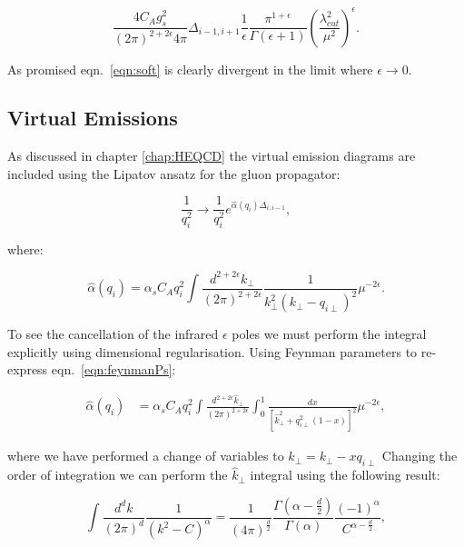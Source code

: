 			\begin{equation}
				\frac{4C_Ag_s^2}{(2\pi)^{2+2\epsilon}4\pi}\Delta_{i-1, i+1}
				\frac{1}{\epsilon}\frac{\pi^{1+\epsilon}}
				{\Gamma(\epsilon+1)}\left(\frac{\lambda_{cut}^2}{\mu^2}\right)^\epsilon.
				\label{eqn:soft}
			\end{equation}

			As promised eqn.~\eqref{eqn:soft} is clearly divergent in the limit where $\epsilon\to0$.

	\subsection{Virtual Emissions}
		\label{sub:subsection_name}

		As discussed in chapter \ref{chap:HEQCD} the virtual emission diagrams are included
		using the Lipatov ansatz for the gluon propagator:

		\begin{equation}
			\frac{1}{q_i^2}\longrightarrow\frac{1}{q_i^2}e^{\hat{\alpha}(q_i)\Delta_{i,i-1}},
		\end{equation}

		where:

		\begin{equation}
			\hat{\alpha}(q_i) = \alpha_sC_Aq_i^2\int \frac{d^{2+2\epsilon}k_{\perp}}{(2\pi)^{2+2\epsilon}}
			\frac{1}{k^2_\perp(k_\perp - q_{i\perp})^2}\mu^{-2\epsilon}.
			\label{eqn:feynmanPs}
		\end{equation}

		To see the cancellation of the infrared $\epsilon$ poles we must perform the integral
		explicitly using dimensional regularisation. Using Feynman parameters to re-express
		eqn.~\eqref{eqn:feynmanPs}:

		\begin{align}
			\hat{\alpha}(q_i) &= \alpha_sC_Aq_i^2\int \frac{d^{2+2\epsilon}\hat{k}_{\perp}}{(2\pi)^{2+2\epsilon}}\int_0^1
				\frac{dx}{[\hat{k}^2 _\perp + q_{i\perp}^2(1-x)]^2}\mu^{-2\epsilon},
		\end{align}

		where we have performed a change of variables to $\hat{k}_\perp = k_\perp - xq_{i\perp}$
		Changing the order of integration we can perform the $\hat{k}_\perp$ integral
		using the following result:

		\begin{equation}
			\int \frac{d^dk}{(2\pi)^d}\frac{1}{(k^2 - C)^\alpha} = \frac{1}{(4\pi)^{\frac{d}{2}}}
				\frac{\Gamma(\alpha - \frac{d}{2})}{\Gamma(\alpha)}
				\frac{(-1)^\alpha}{C^{\alpha - \frac{d}{2}}},
		\end{equation}


